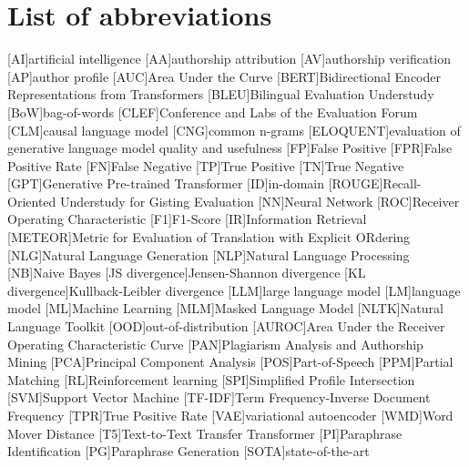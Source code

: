 \chapter*{List of abbreviations}

\begin{acronym}[XXXXXXXXX]
    [AI]{artificial intelligence}
    [AA]{authorship attribution}
    [AV]{authorship verification}
    [AP]{author profile}
    [AUC]{Area Under the Curve}
    [BERT]{Bidirectional Encoder Representations from Transformers}
    [BLEU]{Bilingual Evaluation Understudy}
    [BoW]{bag-of-words}
    [CLEF]{Conference and Labs of the Evaluation Forum}
    [CLM]{causal language model}
    [CNG]{common n-grams}
    [ELOQUENT]{evaluation of generative language model quality and usefulness}
    [FP]{False Positive}
    [FPR]{False Positive Rate}
    [FN]{False Negative}
    [TP]{True Positive}
    [TN]{True Negative}
    [GPT]{Generative Pre-trained Transformer}
    [ID]{in-domain}
    [ROUGE]{Recall-Oriented Understudy for Gisting Evaluation}
    [NN]{Neural Network}
    [ROC]{Receiver Operating Characteristic}
    [F1]{F1-Score}
    [IR]{Information Retrieval}
    [METEOR]{Metric for Evaluation of Translation with Explicit ORdering}
    [NLG]{Natural Language Generation}
    [NLP]{Natural Language Processing}
    [NB]{Naive Bayes}
    [JS divergence]{Jensen-Shannon divergence}
    [KL divergence]{Kullback-Leibler divergence}
    [LLM]{large language model}
    [LM]{language model}
    [ML]{Machine Learning}
    [MLM]{Masked Language Model}
    [NLTK]{Natural Language Toolkit}
    [OOD]{out-of-distribution}
    [AUROC]{Area Under the Receiver Operating Characteristic Curve}
    [PAN]{Plagiarism Analysis and Authorship Mining} %
    [PCA]{Principal Component Analysis}
    [POS]{Part-of-Speech}
    [PPM]{Partial Matching}
    [RL]{Reinforcement learning}
    [SPI]{Simplified Profile Intersection}
    [SVM]{Support Vector Machine}
    [TF-IDF]{Term Frequency-Inverse Document Frequency}
    [TPR]{True Positive Rate}
    [VAE]{variational autoencoder}
    [WMD]{Word Mover Distance}
    [T5]{Text-to-Text Transfer Transformer}
    [PI]{Paraphrase Identification}
    [PG]{Paraphrase Generation}
    [SOTA]{state-of-the-art}

\end{acronym}
